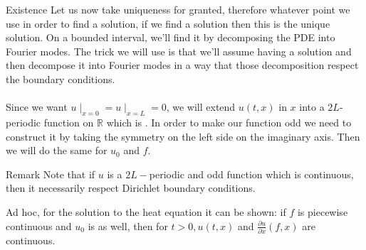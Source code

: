 \begin{parag}{Existence}
    Let us now take uniqueness for granted, therefore whatever point we use in order to find a solution, if we find a solution then this is the unique solution. On a bounded interval, we'll find it by decomposing the PDE into Fourier modes. The trick we will use is that we'll assume having a solution and then decompose it into Fourier modes in a way that those decomposition respect the boundary conditions.\\
	$ $\\
	Since we want $u \mid_{x= 0} = u \mid_{x = L}= 0$, we will extend $u\left(t, x\right)$ in $x$ into a $2L$-periodic function on $ \mathbb{R}$ which is . In order to make our function odd we need to construct it by taking the symmetry on the left side on the imaginary axis. Then we will do the same for $u_{0}$ and $f$.
	\begin{subparag}{Remark}
	    Note that if $u$ is  a $2L-$periodic and odd function which is continuous, then it necessarily respect Dirichlet boundary conditions.
	\end{subparag}
	Ad hoc, for the solution to the heat equation it can be shown: if $f$ is piecewise continuous and $u_0$ is as well, then for $t > 0, u\left(t, x\right)$ and $\frac{\partial u}{\partial x} \left(f, x\right)$ are continuous.
\end{parag}


